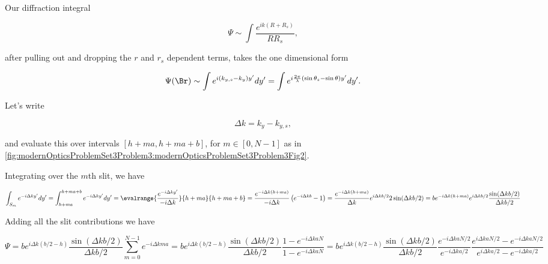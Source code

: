 {Our diffraction integral

\begin{dmath}\label{eqn:modernOptics:problemSet3:3:160}
\Psi \sim \int \frac{e^{i k (R + R_s)}}{ R R_s},
\end{dmath}

after pulling out and dropping the $r$ and $r_s$ dependent terms, takes the one dimensional form

\begin{dmath}\label{eqn:modernOptics:problemSet3:3:180}
\Psi(\Br) \sim \int e^{i (k_{y,s} - k_{y}) y' } dy'
=
\int e^{i \frac{2 \pi}{\lambda} (\sin\theta_s - \sin\theta) y' } dy'.
\end{dmath}

Let's write

\begin{dmath}\label{eqn:modernOptics:problemSet3:3:200}
\Delta k = k_{y} - k_{y,s},
\end{dmath}

and evaluate this over intervals $[h + m a, h + m a + b]$, for $m \in [0, N-1]$ as in \cref{fig:modernOpticsProblemSet3Problem3:modernOpticsProblemSet3Problem3Fig2}.


Integrating over the $m$th slit, we have

\begin{dmath}\label{eqn:modernOptics:problemSet3:3:220}
\int_{S_m} e^{-i \Delta k y' } dy'
=
\int_{h + m a }^{h + m a + b} e^{-i \Delta k y' } dy'
=
\evalrange{\frac{e^{-i \Delta k y' }}{-i \Delta k }}
{h + m a }{h + m a + b} 
=
\frac{e^{-i \Delta k (h + m a) }}{-i \Delta k }
\left( e^{-i \Delta k b } - 1 \right)
=
\frac{e^{-i \Delta k (h + m a ) }}{\Delta k }
e^{i \Delta k b/2 } 2 \sin( \Delta k b/2 )
=
b e^{-i \Delta k (h + m a ) }
e^{i \Delta k b/2 } \frac{\sin( \Delta k b/2 )}{ \Delta k b/2}
\end{dmath}

Adding all the slit contributions we have

\begin{dmath}\label{eqn:modernOptics:problemSet3:3:240}
\Psi = 
b 
e^{i \Delta k (b/2 -h) } 
\frac{\sin( \Delta k b/2 )}{ \Delta k b/2}
\sum_{m = 0}^{N-1}
e^{-i \Delta k m a }
=
b 
e^{i \Delta k (b/2 -h) } 
\frac{\sin( \Delta k b/2 )}{ \Delta k b/2}
\frac{1 - e^{-i \Delta k a N }}
{1 - e^{-i \Delta k a N }}
=
b 
e^{i \Delta k (b/2 -h) } 
\frac{\sin( \Delta k b/2 )}{ \Delta k b/2}
\frac
{
e^{-i \Delta k a N/2 }
}
{
e^{-i \Delta k a /2 }
}
\frac
{
e^{i \Delta k a N/2 } - e^{-i \Delta k a N/2 }
}
{
e^{i \Delta k a /2 } - e^{-i \Delta k a /2 }
}
\end{dmath}

}
